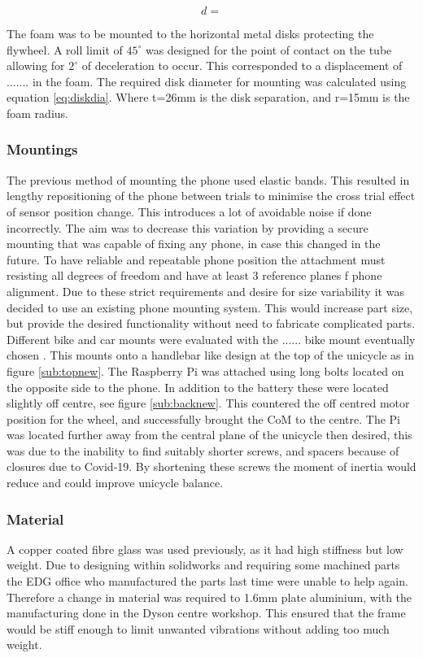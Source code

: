 \documentclass[twoside,twocolumn,12pt]{article}
\begin{document}
\begin{equation}
d = 
\label{eq:diskdia}
\end{equation}

The foam was to be mounted to the horizontal metal disks protecting the flywheel. A roll limit of $45^{\circ}$ was designed for the point of contact on the tube allowing for $2^{\circ}$ of deceleration to occur. This corresponded to a displacement of ....... in the foam. The required disk diameter for mounting was calculated using equation \ref{eq:diskdia}. Where t=26mm is the disk separation, and r=15mm is the foam radius.

\subsubsection{Mountings}
The previous method of mounting the phone used elastic bands. This resulted in lengthy repositioning of the phone between trials to minimise the cross trial effect of sensor position change. This introduces a lot of avoidable noise if done incorrectly. The aim was to decrease this variation by providing a secure mounting that was capable of fixing any phone, in case this changed in the future. 
\newline
To have reliable and repeatable phone position the attachment must resisting all degrees of freedom and have at least 3 reference planes f phone alignment. Due to these strict requirements and desire for size variability it was decided to use an existing phone mounting system. This would increase part size, but provide the desired functionality without need to fabricate complicated parts. Different bike and car mounts were evaluated with the ...... bike mount eventually chosen \cite{bike}. This mounts onto a handlebar like design at the top of the unicycle as in figure \ref{sub:topnew}. 
\newline
The Raspberry Pi was attached using long bolts located on the opposite side to the phone. In addition to the battery these were located slightly off centre, see figure \ref{sub:backnew}. This countered the off centred motor position for the wheel, and successfully brought the CoM to the centre. The Pi was located further away from the central plane of the unicycle then desired, this was due to the inability to find suitably shorter screws, and spacers because of closures due to Covid-19. By shortening these screws the moment of inertia would reduce and could improve unicycle balance.  
\subsubsection{Material}
A copper coated fibre glass was used previously, as it had high stiffness but low weight. Due to designing within solidworks and requiring some machined parts the EDG office who manufactured the parts last time were unable to help again. Therefore a change in material was required to 1.6mm plate aluminium, with the manufacturing done in the Dyson centre workshop. This ensured that the frame would be stiff enough to limit unwanted vibrations without adding too much weight. 
\end{document}
